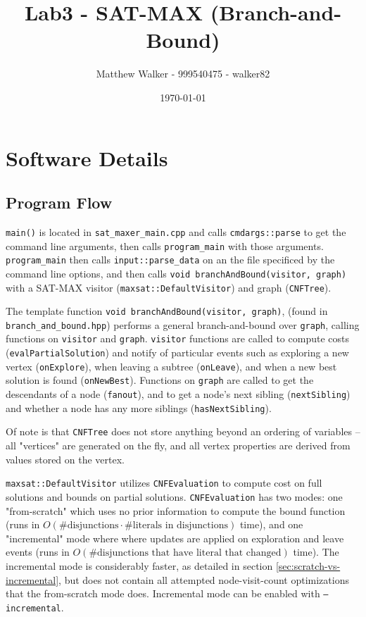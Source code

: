 \documentclass[10pt]{article}
\title{Lab3 - SAT-MAX (Branch-and-Bound)}
\author{Matthew Walker - 999540475 - walker82}
\date{\today}
\begin{document}
\maketitle

\section{Software Details}
\subsection{Program Flow}
\texttt{main()} is located in \texttt{sat_maxer_main.cpp} and calls \texttt{cmdargs::parse} to get the command line arguments, then calls \texttt{program_main} with those arguments. \texttt{program_main} then calls \texttt{input::parse_data} on an the file specificed by the command line options, and then calls \texttt{void branchAndBound(visitor, graph)} with a SAT-MAX visitor (\texttt{maxsat::DefaultVisitor}) and graph (\texttt{CNFTree}).

The template function \texttt{void branchAndBound(visitor, graph)}, (found in \texttt{branch_and_bound.hpp}) performs a general branch-and-bound over \texttt{graph}, calling functions on \texttt{visitor} and \texttt{graph}. \texttt{visitor} functions are called to compute costs (\texttt{evalPartialSolution}) and notify of particular events such as exploring a new vertex (\texttt{onExplore}), when leaving a subtree (\texttt{onLeave}), and when a new best solution is found (\texttt{onNewBest}). Functions on \texttt{graph} are called to get the descendants of a node (\texttt{fanout}), and to get a node's next sibling (\texttt{nextSibling}) and whether a node has any more siblings (\texttt{hasNextSibling}).

Of note is that \texttt{CNFTree} does not store anything beyond an ordering of variables -- all "vertices" are generated on the fly, and all vertex properties are derived from values stored on the vertex.

\label{sec:eval-intro}
\texttt{maxsat::DefaultVisitor} utilizes \texttt{CNFEvaluation} to compute cost on full solutions and bounds on partial solutions. \texttt{CNFEvaluation} has two modes: one "from-scratch" which uses no prior information to compute the bound function (runs in \(O(\#\text{disjunctions} \cdot \#\text{literals in disjunctions})\) time), and one "incremental" mode where where updates are applied on exploration and leave events (runs in \(O(\#\text{disjunctions that have literal that changed})\) time). The incremental mode is considerably faster, as detailed in section \ref{sec:scratch-vs-incremental}, but does not contain all attempted node-visit-count optimizations that the from-scratch mode does. Incremental mode can be enabled with \texttt{--incremental}.
\end{document}
